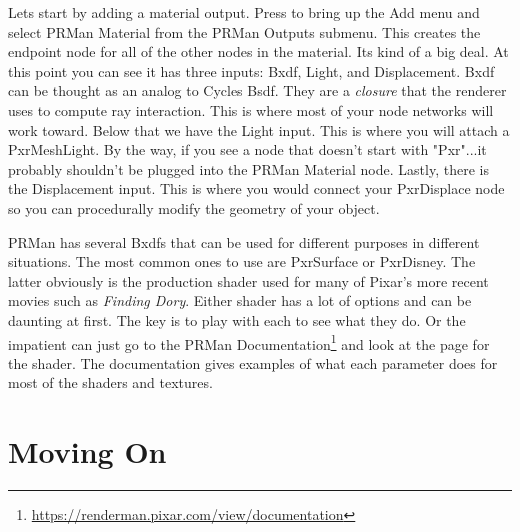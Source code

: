 Lets start by adding a material output.  Press  to bring up the \textsf{Add} menu and select \textsf{PRMan Material} from the \textsf{PRMan Outputs} submenu.  This creates the endpoint node for all of the other nodes in the material.  Its kind of a big deal.  At this point you can see it has three inputs:  \textsf{Bxdf}, \textsf{Light}, and \textsf{Displacement}.  \textsf{Bxdf} can be thought as an analog to Cycles \textsf{Bsdf}.  They are a \emph{closure} that the renderer uses to compute ray interaction.  This is where most of your node networks will work toward.  Below that we have the \textsf{Light} input.  This is where you will attach a \textsf{PxrMeshLight}.  By the way, if you see a node that doesn't start with "Pxr"...it probably shouldn't be plugged into the \textsf{PRMan Material} node.  Lastly, there is the \textsf{Displacement} input.  This is where you would connect your \textsf{PxrDisplace} node so you can procedurally modify the geometry of your object. 

PRMan has several Bxdfs that can be used for different purposes in different situations.  The most common ones to use are \textsf{PxrSurface} or \textsf{PxrDisney}.  The latter obviously is the production shader used for many of Pixar's more recent movies such as \textsl{Finding Dory}. Either shader has a lot of options and can be daunting at first.  The key is to play with each to see what they do.  Or the impatient can just go to the PRMan Documentation\footnote{\url{https://renderman.pixar.com/view/documentation}} and look at the page for the shader.  The documentation gives examples of what each parameter does for most of the shaders and textures.

\section{Moving On}

